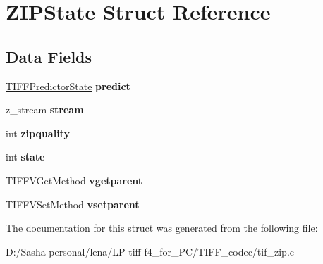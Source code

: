 \hypertarget{struct_z_i_p_state}{}\section{Z\+I\+P\+State Struct Reference}
\label{struct_z_i_p_state}
\subsection*{Data Fields}
\begin{DoxyCompactItemize}
\item 
\hypertarget{struct_z_i_p_state_a75c0cad87a8fdd68f1ecf6a2fc0b241f}{}\hyperlink{struct_t_i_f_f_predictor_state}{T\+I\+F\+F\+Predictor\+State} {\bfseries predict}\label{struct_z_i_p_state_a75c0cad87a8fdd68f1ecf6a2fc0b241f}

\item 
\hypertarget{struct_z_i_p_state_a0638be9c24bcf222e469504e561ce8b2}{}z\+\_\+stream {\bfseries stream}\label{struct_z_i_p_state_a0638be9c24bcf222e469504e561ce8b2}

\item 
\hypertarget{struct_z_i_p_state_a9292d53c51e6a57eb948c28ca6aa14e8}{}int {\bfseries zipquality}\label{struct_z_i_p_state_a9292d53c51e6a57eb948c28ca6aa14e8}

\item 
\hypertarget{struct_z_i_p_state_a89f234133d3efe315836311cbf21c64b}{}int {\bfseries state}\label{struct_z_i_p_state_a89f234133d3efe315836311cbf21c64b}

\item 
\hypertarget{struct_z_i_p_state_a6aa94880716a95ef6ecb6504e377e504}{}T\+I\+F\+F\+V\+Get\+Method {\bfseries vgetparent}\label{struct_z_i_p_state_a6aa94880716a95ef6ecb6504e377e504}

\item 
\hypertarget{struct_z_i_p_state_ad3e8072d4883a6686f64fb7671e9b3c1}{}T\+I\+F\+F\+V\+Set\+Method {\bfseries vsetparent}\label{struct_z_i_p_state_ad3e8072d4883a6686f64fb7671e9b3c1}

\end{DoxyCompactItemize}


The documentation for this struct was generated from the following file\+:\begin{DoxyCompactItemize}
\item 
D\+:/\+Sasha personal/lena/\+L\+P-\/tiff-\/f4\+\_\+for\+\_\+\+P\+C/\+T\+I\+F\+F\+\_\+codec/tif\+\_\+zip.\+c\end{DoxyCompactItemize}

